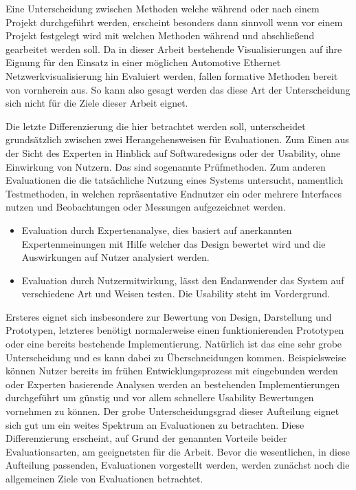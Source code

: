 \documentclass[draft=false
              ,paper=a4
              ,twoside=false
              ,fontsize=11pt
              ,headsepline
              ,BCOR10mm
              ,DIV11
              ]{scrbook}
\begin{document}
Eine Unterscheidung zwischen Methoden welche während oder nach einem Projekt durchgeführt werden, erscheint besonders dann sinnvoll wenn vor einem Projekt festgelegt wird mit welchen Methoden während und abschließend gearbeitet werden soll. Da in dieser Arbeit bestehende Visualisierungen auf ihre Eignung für den Einsatz in einer möglichen Automotive Ethernet Netzwerkvisualisierung hin Evaluiert werden, fallen formative Methoden bereit von vornherein aus. So kann also gesagt werden das diese Art der Unterscheidung sich nicht für die Ziele dieser Arbeit eignet. 

Die letzte Differenzierung die hier betrachtet werden soll, unterscheidet
grundsätzlich zwischen zwei Herangehensweisen für Evaluationen. Zum Einen aus der Sicht des Experten in Hinblick auf Softwaredesigns oder der Usability, ohne Einwirkung von Nutzern. Das sind sogenannte Prüfmethoden. Zum anderen Evaluationen die die tatsächliche Nutzung eines Systems untersucht, namentlich Testmethoden, in welchen repräsentative Endnutzer ein oder mehrere Interfaces nutzen und Beobachtungen oder Messungen aufgezeichnet werden.
\begin{itemize}
  \item Evaluation durch Expertenanalyse, dies basiert auf anerkannten Expertenmeinungen mit Hilfe welcher das Design bewertet wird und die Auswirkungen auf Nutzer analysiert werden.
  \item Evaluation durch Nutzermitwirkung, lässt den Endanwender das System auf verschiedene Art und Weisen testen. Die Usability steht im Vordergrund.
\end{itemize}
Ersteres eignet sich insbesondere zur Bewertung von Design, Darstellung und Prototypen, letzteres benötigt normalerweise einen funktionierenden Prototypen oder eine bereits bestehende Implementierung. Natürlich ist das eine sehr grobe Unterscheidung und es kann dabei zu Überschneidungen kommen. Beispielsweise können Nutzer bereits im frühen Entwicklungsprozess mit eingebunden werden oder Experten basierende Analysen werden an bestehenden Implementierungen durchgeführt um günstig und vor allem schnellere Usability Bewertungen vornehmen zu können. Der grobe Unterscheidungsgrad dieser Aufteilung eignet sich gut um ein weites Spektrum an Evaluationen zu betrachten. Diese Differenzierung erscheint, auf Grund der genannten Vorteile beider Evaluationsarten, am geeignetsten für die Arbeit. Bevor die wesentlichen, in diese Aufteilung passenden, Evaluationen vorgestellt werden, werden zunächst noch die allgemeinen Ziele von Evaluationen betrachtet.
\end{document}
